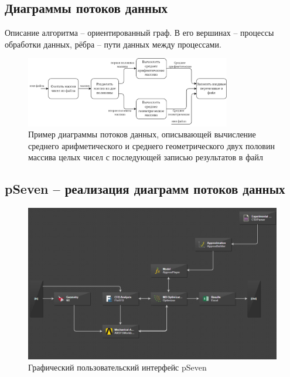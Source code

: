 \subsection{Диаграммы потоков данных}
\begin{frame}
    Описание алгоритма -- ориентированный граф. В его вершинах -- процессы обработки данных, рёбра -- пути данных между процессами.

    \begin{figure}
        \centering
        \includegraphics[width=0.8\textwidth]{images/illustration.dataflow.png}
        \caption{Пример диаграммы потоков данных, описывающей вычисление среднего арифметического и среднего геометрического двух половин массива целых чисел с последующей записью результатов в файл}
    \end{figure}

\end{frame}


\subsection{pSeven -- реализация диаграмм потоков данных}
\begin{frame}
    \begin{figure}
        \centering
        \includegraphics[width=\textwidth]{images/workflow1.png}
        \caption{Графический пользовательский интерфейс pSeven}
    \end{figure}

\end{frame}

